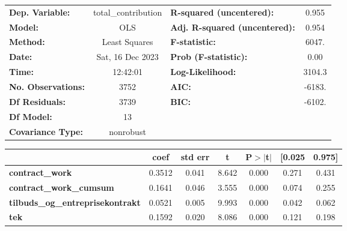 \begin{center}
\begin{tabular}{lclc}
\toprule
\textbf{Dep. Variable:}                  & total\_contribution & \textbf{  R-squared (uncentered):}      &     0.955   \\
\textbf{Model:}                          &         OLS         & \textbf{  Adj. R-squared (uncentered):} &     0.954   \\
\textbf{Method:}                         &    Least Squares    & \textbf{  F-statistic:       }          &     6047.   \\
\textbf{Date:}                           &   Sat, 16 Dec 2023  & \textbf{  Prob (F-statistic):}          &     0.00    \\
\textbf{Time:}                           &       12:42:01      & \textbf{  Log-Likelihood:    }          &    3104.3   \\
\textbf{No. Observations:}               &          3752       & \textbf{  AIC:               }          &    -6183.   \\
\textbf{Df Residuals:}                   &          3739       & \textbf{  BIC:               }          &    -6102.   \\
\textbf{Df Model:}                       &            13       & \textbf{                     }          &             \\
\textbf{Covariance Type:}                &      nonrobust      & \textbf{                     }          &             \\
\bottomrule
\end{tabular}
\begin{tabular}{lcccccc}
                                         & \textbf{coef} & \textbf{std err} & \textbf{t} & \textbf{P$> |$t$|$} & \textbf{[0.025} & \textbf{0.975]}  \\
\midrule
\textbf{contract\_work}                  &       0.3512  &        0.041     &     8.642  &         0.000        &        0.271    &        0.431     \\
\textbf{contract\_work\_cumsum}          &       0.1641  &        0.046     &     3.555  &         0.000        &        0.074    &        0.255     \\
\textbf{tilbuds\_og\_entreprisekontrakt} &       0.0521  &        0.005     &     9.993  &         0.000        &        0.042    &        0.062     \\
\textbf{tek}                             &       0.1592  &        0.020     &     8.086  &         0.000        &        0.121    &        0.198     \\

\end{tabular}
\end{center}
